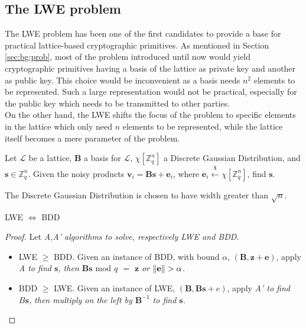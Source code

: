 \subsection{The LWE problem}
The LWE problem has been one of the first candidates to provide a base for practical lattice-based cryptographic primitives. As mentioned in Section \ref{sec:bg:prob}, most of the problem introduced until now would yield cryptographic primitives having a basis of the lattice as private key and another as public key. This choice would be inconvenient as a basis needs $n^2$ elements to be represented. Such a large representation would not be practical, especially for the public key which needs to be transmitted to other parties.\\
On the other hand, the LWE shifts the focus of the problem to specific elements in the lattice which only need $n$ elements to be represented, while the lattice itself becomes a mere parameter of the problem.\\


\begin{definition}
Let $\mathscr{L}$ be a lattice, $\mathbf{B}$ a basis for $\mathscr{L}$, $\chi[\mathbb{Z}_q^n]$ a Discrete Gaussian Distribution, and $\mathbf{s}\in\mathbb{Z}_q^n$. Given the noisy products $\mathbf{v}_i=\mathbf{Bs} + \mathbf{e}_i$, where $\mathbf{e}_i\xleftarrow{\$}\chi[\mathbb{Z}_q^n]$, find $\mathbf{s}$.
\end{definition}

\begin{remark}
The Discrete Gaussian Distribution is chosen to have width greater than $\sqrt{n}$.
\end{remark}

\begin{theorem}
LWE $\Leftrightarrow$ BDD
\end{theorem}
\begin{proof}
Let \it{A},\it{A'} algorithms to solve, respectively LWE and BDD.
\begin{itemize}
\item LWE $\geq$ BDD. Given an instance of BDD, with bound $\alpha$, $(\mathbf{B},\mathbf{z}+\mathbf{e})$, apply \it{A} to find $\mathbf{s}$, then $\mathbf{Bs}$ $\mathrm{mod}$ $q$ $=$ $\mathbf{z}$ or $\left\lVert \mathbf{e} \right\rVert>\alpha$.
\item BDD $\geq$ LWE. Given an instance of LWE, $(\mathbf{B},\mathbf{Bs}+e)$, apply \it{A'} to find $B\mathbf{s}$, then multiply on the left by $\mathbf{B}^{-1}$ to find $\mathbf{s}$.
\end{itemize}
\end{proof}

